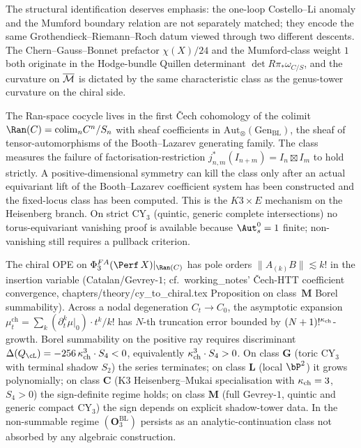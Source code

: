 The structural identification deserves emphasis: the one-loop
Costello--Li anomaly and the Mumford boundary relation are not
separately matched; they encode the same Grothendieck--Riemann--Roch
datum viewed through two different descents. The Chern--Gauss--Bonnet
prefactor $\chi(X)/24$ and the Mumford-class weight $1$ both originate
in the Hodge-bundle Quillen determinant $\det R\pi_\ast \omega_{C/S}$,
and the curvature on $\overline{\mathcal{M}}$ is dictated by the same characteristic
class as the genus-tower curvature on the chiral side.

\begin{remark}
\label{rem:O1-BL-residual}
The Ran-space cocycle lives in the first \v{C}ech cohomology of the
colimit $\Ran(C) = \mathrm{colim}_n C^n/S_n$ with sheaf coefficients
in $\mathrm{Aut}_\otimes(\mathrm{Gen}_{\mathrm{BL}})$, the sheaf of
tensor-automorphisms of the Booth--Lazarev generating family. The
class measures the failure of factorisation-restriction
$j^*_{n, m}(I_{n+m}) = I_n \boxtimes I_m$ to hold strictly. A
positive-dimensional symmetry can kill the class only after an actual
equivariant lift of the Booth--Lazarev coefficient system has been
constructed and the fixed-locus class has been computed. This is the
$K3\times E$ mechanism on the Heisenberg branch. On strict CY$_3$
(quintic, generic complete intersections) no torus-equivariant
vanishing proof is available because $\Aut^0_s=1$ finite; non-vanishing
still requires a pullback criterion.
\end{remark}

\begin{remark}
\label{rem:O3-BL-borel}
The chiral OPE on $\Phi^{FA}_3(\Perf\,X)|_{\Ran(C)}$ has pole orders
$\|A_{(k)} B\| \lesssim k!$ in the insertion variable
(Catalan/Gevrey-$1$; cf.\ working\_notes' \v{C}ech-HTT coefficient
convergence, chapters/theory/cy\_to\_chiral.tex Proposition on
class~$\mathbf{M}$ Borel summability). Across a nodal degeneration
$C_t \to C_0$, the asymptotic expansion
$\mu^{\mathrm{ch}}_t = \sum_k (\partial_t^k \mu|_0) \cdot t^k / k!$
has $N$-th truncation error bounded by $(N+1)!^{\kappa_{\mathrm{ch}}}$-growth.
Borel summability on the positive ray requires discriminant
$\Delta(Q_\cL) = -256\,\kch^3 \cdot S_4 < 0$, equivalently
$\kappa_{\mathrm{ch}}^3 \cdot S_4 > 0$. On class $\mathbf{G}$ (toric CY$_3$ with
terminal shadow $S_2$) the series terminates; on class $\mathbf{L}$
(local $\bP^2$) it grows polynomially; on class $\mathbf{C}$ (K3
Heisenberg--Mukai specialisation with $\kappa_{\mathrm{ch}} = 3$, $S_4 > 0$) the
sign-definite regime holds; on class $\mathbf{M}$ (full Gevrey-$1$,
quintic and generic compact CY$_3$) the sign depends on explicit
shadow-tower data. In the non-summable regime
$(\mathbf{O}_3^{\mathrm{BL}})$ persists as an analytic-continuation
class not absorbed by any algebraic construction.
\end{remark}

